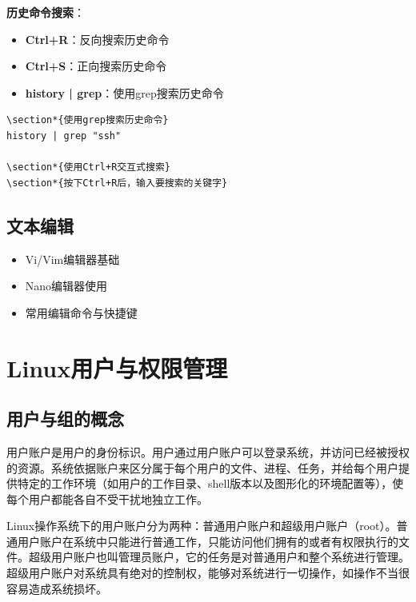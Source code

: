 \documentclass[12pt,UTF8]{ctexbook}
\begin{document}
\textbf{历史命令搜索}：
\begin{itemize}
    \item \textbf{Ctrl+R}：反向搜索历史命令
    \item \textbf{Ctrl+S}：正向搜索历史命令
    \item \textbf{history | grep}：使用grep搜索历史命令
\end{itemize}

\begin{verbatim}
\section*{使用grep搜索历史命令}
history | grep "ssh"

\section*{使用Ctrl+R交互式搜索}
\section*{按下Ctrl+R后，输入要搜索的关键字}
\end{verbatim}

\section{文本编辑}
\begin{itemize}
    \item Vi/Vim编辑器基础
    \item Nano编辑器使用
    \item 常用编辑命令与快捷键
\end{itemize}

\chapter{Linux用户与权限管理}

\section{用户与组的概念}

用户账户是用户的身份标识。用户通过用户账户可以登录系统，并访问已经被授权的资源。系统依据账户来区分属于每个用户的文件、进程、任务，并给每个用户提供特定的工作环境（如用户的工作目录、shell版本以及图形化的环境配置等），使每个用户都能各自不受干扰地独立工作。

Linux操作系统下的用户账户分为两种：普通用户账户和超级用户账户（root）。普通用户账户在系统中只能进行普通工作，只能访问他们拥有的或者有权限执行的文件。超级用户账户也叫管理员账户，它的任务是对普通用户和整个系统进行管理。超级用户账户对系统具有绝对的控制权，能够对系统进行一切操作，如操作不当很容易造成系统损坏。
\end{document}

